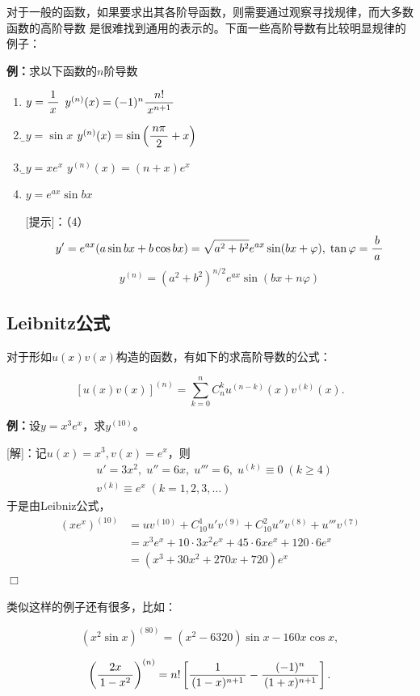 对于一般的函数，如果要求出其各阶导函数，则需要通过观察寻找规律，而大多数函数的高阶导数
是很难找到通用的表示的。下面一些高阶导数有比较明显规律的例子：

{\bf 例：}求以下函数的$n$阶导数
\begin{enumerate}[(1)]
  \setlength{\itemindent}{1cm}
  \item $y=\displaystyle\frac{\,{1}\,}{\,{x}\,}$ \hfill $y^{(n)}(x)=(-1)^n\displaystyle\frac{\,{n!}\,}{\,{x^{n+1}}\,}$ 
  \item {\b$y=\sin x$ \hfill
  $y^{(n)}(x)=\sin\left(\displaystyle\frac{\,{n\pi}\,}{\,{2}\,}+x\right)$} 
  \item {\b$y=xe^x$ \hfill $y^{(n)}(x)=(n+x)e^x$}
  \item $y=e^{ax}\sin bx$

[提示]：（4）
$$y'=e^{ax}(a\sin bx+b\cos
bx)=\sqrt{a^2+b^2}e^{ax}\sin(bx+\varphi),
\;\tan\varphi=\displaystyle\frac{\,{b}\,}{\,{a}\,}$$
$$y^{(n)}=\left(a^2+b^2\right)^{n/2}e^{ax}\sin(bx+n\varphi)$$ 
\end{enumerate}

\subsection{Leibnitz公式}

对于形如$u(x)v(x)$构造的函数，有如下的求高阶导数的公式：

\begin{thx}
	$$\left[u(x)v(x)\right]^{(n)}=
	\sum\limits_{k=0}^nC_n^ku^{(n-k)}(x)v^{(k)}(x).$$
\end{thx}

{\bf 例：}设$y=x^3e^x$，求$y^{(10)}$。

[解]：记$u(x)=x^3,v(x)=e^x$，则
\begin{align*}
	& u'=3x^2, \; u''=6x, \; u'''=6, \; u^{(k)}\equiv 0\;(k\geq 4)\\
	& v^{(k)}\equiv e^x\;(k=1,2,3,\ldots)
\end{align*}
于是由Leibniz公式，
\begin{align*}
	(xe^x)^{(10)}
	&=uv^{(10)}+C_{10}^1u'v^{(9)}+C_{10}^2u''v^{(8)}+u'''v^{(7)}\\
	&=x^3e^x+10\cdot 3x^2e^x+45\cdot 6xe^x+120\cdot 6e^x\\
	&=(x^3+30x^2+270x+720)e^x
\end{align*}
\hfill$\Box$

类似这样的例子还有很多，比如：

$$(x^2\sin x)^{(80)}=(x^2-6320)\sin x-160x\cos x,$$

$$\left(\displaystyle\frac{\,{2x}\,}{\,{1-x^2}\,}\right)^{(n)}=n!\left[\displaystyle\frac{\,{1}\,}{\,{(1-x)^{n+1}}\,}
-\displaystyle\frac{\,{(-1)^n}\,}{\,{(1+x)^{n+1}}\,}\right].$$

